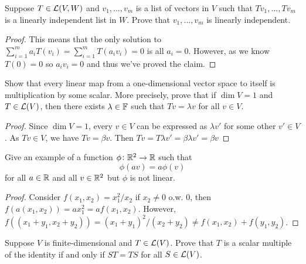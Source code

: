 \documentclass{extarticle}
\begin{document}
\begin{problem}{4}
    Suppose \(T \in \mathcal{L}(V, W)\) and \(v_1, \ldots, v_m\) is a list of vectors in \(V\) such that 
    \(T v_1, \ldots, T v_m\) is a linearly independent list in \(W\). Prove that \(v_1, \ldots, v_m\)
    is linearly independent. 
\end{problem}

\begin{proof}
This means that the only solution to \(\sum_{i=1}^{m} a_i T(v_i) = \sum_{i=1}^{m} T(a_i v_i) = 0\)
is all \(a_i = 0\). However, as we know \(T(0) = 0\) so \(a_i v_i = 0\) and thus we've proved the claim. 
\end{proof}

\begin{problem}{7}
    Show that every linear map from a one-dimensional vector space to itself is multiplication 
    by some scalar. More precisely, prove that if \(\dim V = 1\) and \(T \in \mathcal{L}(V)\), then 
    there exists \(\lambda \in \mathbb{F}\) such that \(T v = \lambda v\) for all \(v \in V\). 
\end{problem}

\begin{proof}
Since \(\dim V = 1\), every \(v \in V\) can be expressed as \(\lambda v'\) for some other \(v' \in V\). 
As \(Tv \in V\), we have \(Tv = \beta v\). Then \(T v = T \lambda v' = \beta \lambda v' = \beta v\)
\end{proof}

\begin{problem}{8}
    Give an example of a function \(\phi \colon \mathbb{R}^2 \to \mathbb{R}\) such that 
    \[\phi(av) = a\phi(v)\]
    for all \(a \in \mathbb{R}\) and all \(v \in \mathbb{R}^2\) but \(\phi\) is not linear. 
\end{problem}

\begin{proof}
Consider \(f(x_1, x_2) = x_1^2 / x_2\) if \(x_2 \neq 0\) o.w. 0, then \(f(a(x_1, x_2)) = a x_1^2 = a f(x_1, x_2)\). 
However, \(f((x_1 + y_1 , x_2 + y_2)) = (x_1 + y_1)^2 / (x_2 + y_2) \neq f(x_1, x_2) + f(y_1, y_2)\). 
\end{proof}

\begin{problem}{11}
    Suppose \(V\) is finite-dimensional and \(T \in \mathcal{L}(V)\). Prove that \(T\) is a scalar multiple 
    of the identity if and only if \(S T = TS\) for all \(S \in \mathcal{L}(V)\). 
\end{problem}
\end{document}
